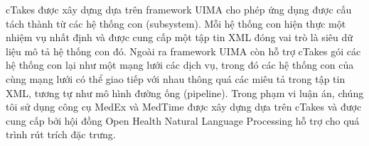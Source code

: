 
cTakes được xây dựng dựa trên framework UIMA cho phép ứng dụng được cấu tách thành từ các hệ thống con (subsystem). Mỗi hệ thống con hiện thực một nhiệm vụ nhất định và được cung cấp một tập tin XML đóng vai trò là siêu dữ liệu mô tả hệ thống con đó. Ngoài ra framework UIMA còn hỗ trợ cTakes gói các hệ thống con lại như một mạng lưới các dịch vụ, trong đó các hệ thống con của cùng mạng lưới có thể giao tiếp với nhau thông quá các miêu tả trong tập tin XML, tương tự như mô hình đường ống (pipeline). Trong phạm vi luận án, chúng tôi sử dụng công cụ MedEx \cite{HuaXu2009} và MedTime \cite{Sohn2013} được xây dựng dựa trên cTakes và được cung cấp bởi hội đồng Open Health Natural Language Processing hỗ trợ cho quá trình rút trích đặc trưng.

